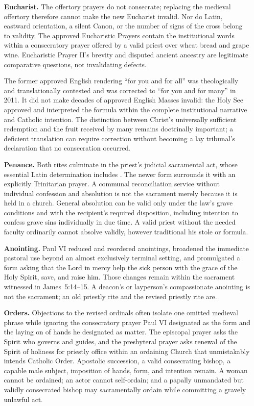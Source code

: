 \textbf{Eucharist.} The offertory prayers do not consecrate; replacing the medieval offertory therefore cannot make the new Eucharist invalid. Nor do Latin, eastward orientation, a silent Canon, or the number of signs of the cross belong to validity. The approved Eucharistic Prayers contain the institutional words within a consecratory prayer offered by a valid priest over wheat bread and grape wine. Eucharistic Prayer II's brevity and disputed ancient ancestry are legitimate comparative questions, not invalidating defects.

The former approved English rendering “for you and for all” was theologically and translationally contested and was corrected to “for you and for many” in 2011. It did not make decades of approved English Masses invalid: the Holy See approved and interpreted the formula within the complete institutional narrative and Catholic intention. The distinction between Christ's universally sufficient redemption and the fruit received by many remains doctrinally important; a deficient translation can require correction without becoming a lay tribunal's declaration that no consecration occurred.

\textbf{Penance.} Both rites culminate in the priest's judicial sacramental act, whose essential Latin determination includes . The newer form surrounds it with an explicitly Trinitarian prayer. A communal reconciliation service without individual confession and absolution is not the sacrament merely because it is held in a church. General absolution can be valid only under the law's grave conditions and with the recipient's required disposition, including intention to confess grave sins individually in due time. A valid priest without the needed faculty ordinarily cannot absolve validly, however traditional his stole or formula.

\textbf{Anointing.} Paul VI reduced and reordered anointings, broadened the immediate pastoral use beyond an almost exclusively terminal setting, and promulgated a form asking that the Lord in mercy help the sick person with the grace of the Holy Spirit, save, and raise him. Those changes remain within the sacrament witnessed in James~5:14--15. A deacon's or layperson's compassionate anointing is not the sacrament; an old priestly rite and the revised priestly rite are.

\textbf{Orders.} Objections to the revised ordinals often isolate one omitted medieval phrase while ignoring the consecratory prayer Paul VI designated as the form and the laying on of hands he designated as matter. The episcopal prayer asks the Spirit who governs and guides, and the presbyteral prayer asks renewal of the Spirit of holiness for priestly office within an ordaining Church that unmistakably intends Catholic Order. Apostolic succession, a valid consecrating bishop, a capable male subject, imposition of hands, form, and intention remain. A woman cannot be ordained; an actor cannot self-ordain; and a papally unmandated but validly consecrated bishop may sacramentally ordain while committing a gravely unlawful act.

